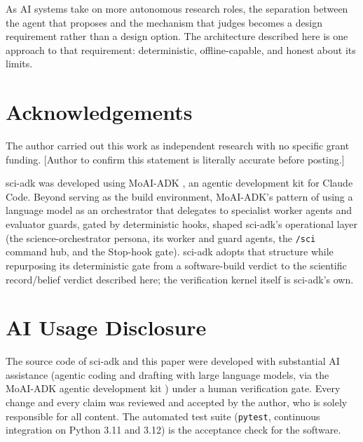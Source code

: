 \documentclass[11pt]{article}
\begin{document}
As AI systems take on more autonomous research roles, the separation between the agent that proposes and the mechanism that judges becomes a design requirement rather than a design option. The architecture described here is one approach to that requirement: deterministic, offline-capable, and honest about its limits.

\section*{Acknowledgements}

The author carried out this work as independent research with no specific grant funding. [Author to confirm this statement is literally accurate before posting.]

sci-adk was developed using MoAI-ADK \citep{moaiadk}, an agentic development kit for Claude Code. Beyond serving as the build environment, MoAI-ADK's pattern of using a language model as an orchestrator that delegates to specialist worker agents and evaluator guards, gated by deterministic hooks, shaped sci-adk's operational layer (the science-orchestrator persona, its worker and guard agents, the \texttt{/sci} command hub, and the Stop-hook gate). sci-adk adopts that structure while repurposing its deterministic gate from a software-build verdict to the scientific record/belief verdict described here; the verification kernel itself is sci-adk's own.

\section*{AI Usage Disclosure}

The source code of sci-adk and this paper were developed with substantial AI assistance (agentic coding and drafting with large language models, via the MoAI-ADK agentic development kit \citep{moaiadk}) under a human verification gate. Every change and every claim was reviewed and accepted by the author, who is solely responsible for all content. The automated test suite (\texttt{pytest}, continuous integration on Python 3.11 and 3.12) is the acceptance check for the software.



\end{document}
